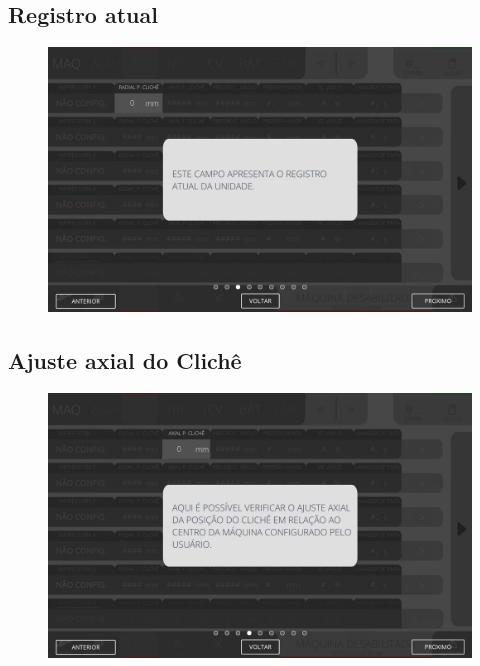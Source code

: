 \subsection{Registro atual}
\begin{figure}
    \centering
    \includegraphics[width=576 px,height=360 px]{src/imagesICV/04-printters/01-printters/settings/3.png}
\end{figure}
\newpage
\thispagestyle{fancy}
\vspace{\fill}

\subsection{Ajuste axial do Clichê}
\begin{figure}
    \centering
    \includegraphics[width=576 px,height=360 px]{src/imagesICV/04-printters/01-printters/settings/4.png}
\end{figure}
\newpage
\thispagestyle{fancy}
\vspace{\fill}

